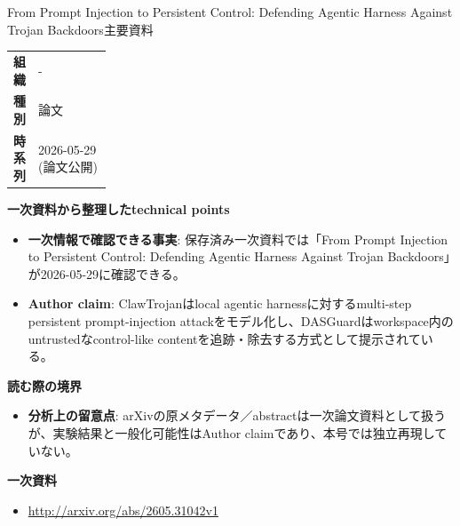 \begin{technicalnote}{From Prompt Injection to Persistent Control: Defending Agentic Harness Against Trojan Backdoors}{主要資料}
\begingroup
\begin{tabularx}{\linewidth}{@{}>{\bfseries}p{0.22\linewidth}X@{}}
組織 & - \\
種別 & 論文 \\
時系列 & 2026-05-29 (論文公開) \\
\end{tabularx}
\smallskip
{\bfseries 一次資料から整理したtechnical points}
\begin{itemize}[leftmargin=1.5em,itemsep=0.35em]
\item \textbf{一次情報で確認できる事実}: 保存済み一次資料では「From Prompt Injection to Persistent Control: Defending Agentic Harness Against Trojan Backdoors」が2026-05-29に確認できる。
\item \textbf{Author claim}: ClawTrojanはlocal agentic harnessに対するmulti-step persistent prompt-injection attackをモデル化し、DASGuardはworkspace内のuntrustedなcontrol-like contentを追跡・除去する方式として提示されている。
\end{itemize}
{\bfseries 読む際の境界}
\begin{itemize}[leftmargin=1.5em,itemsep=0.35em]
\item \textbf{分析上の留意点}: arXivの原メタデータ／abstractは一次論文資料として扱うが、実験結果と一般化可能性はAuthor claimであり、本号では独立再現していない。
\end{itemize}
\begin{samepage}
{\bfseries 一次資料}
\begingroup\sloppy
\begin{itemize}[leftmargin=1.5em,itemsep=0.25em]
\item {\scriptsize\url{http://arxiv.org/abs/2605.31042v1}}
\end{itemize}
\endgroup
\end{samepage}
\endgroup
\end{technicalnote}
\medskip

